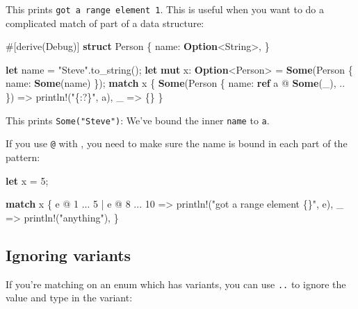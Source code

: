 \documentclass[a4paper,]{book}
\newenvironment{Shaded}{\begin{snugshade}}{\end{snugshade}}
\newcommand{\KeywordTok}[1]{\textcolor[rgb]{0.13,0.29,0.53}{\textbf{{#1}}}}
\newcommand{\DecValTok}[1]{\textcolor[rgb]{0.00,0.00,0.81}{{#1}}}
\newcommand{\StringTok}[1]{\textcolor[rgb]{0.31,0.60,0.02}{{#1}}}
\newcommand{\OtherTok}[1]{\textcolor[rgb]{0.56,0.35,0.01}{{#1}}}
\newcommand{\NormalTok}[1]{{#1}}
\begin{document}
This prints \texttt{got\ a\ range\ element\ 1}. This is useful when you
want to do a complicated match of part of a data structure:

\begin{Shaded}
\begin{Highlighting}[]
\OtherTok{#[}\NormalTok{derive}\OtherTok{(}\NormalTok{Debug}\OtherTok{)]}
\KeywordTok{struct} \NormalTok{Person \{}
    \NormalTok{name: }\KeywordTok{Option}\NormalTok{<String>,}
\NormalTok{\}}

\KeywordTok{let} \NormalTok{name = }\StringTok{"Steve"}\NormalTok{.to_string();}
\KeywordTok{let} \KeywordTok{mut} \NormalTok{x: }\KeywordTok{Option}\NormalTok{<Person> = }\KeywordTok{Some}\NormalTok{(Person \{ name: }\KeywordTok{Some}\NormalTok{(name) \});}
\KeywordTok{match} \NormalTok{x \{}
    \KeywordTok{Some}\NormalTok{(Person \{ name: }\KeywordTok{ref} \NormalTok{a @ }\KeywordTok{Some}\NormalTok{(_), .. \}) => }\OtherTok{println!}\NormalTok{(}\StringTok{"\{:?\}"}\NormalTok{, a),}
    \NormalTok{_ => \{\}}
\NormalTok{\}}
\end{Highlighting}
\end{Shaded}

This prints \texttt{Some("Steve")}: We've bound the inner \texttt{name}
to \texttt{a}.

If you use \texttt{@} with \texttt{\textbar{}}, you need to make sure
the name is bound in each part of the pattern:

\begin{Shaded}
\begin{Highlighting}[]
\KeywordTok{let} \NormalTok{x = }\DecValTok{5}\NormalTok{;}

\KeywordTok{match} \NormalTok{x \{}
    \NormalTok{e @ }\DecValTok{1} \NormalTok{... }\DecValTok{5} \NormalTok{| e @ }\DecValTok{8} \NormalTok{... }\DecValTok{10} \NormalTok{=> }\OtherTok{println!}\NormalTok{(}\StringTok{"got a range element \{\}"}\NormalTok{, e),}
    \NormalTok{_ => }\OtherTok{println!}\NormalTok{(}\StringTok{"anything"}\NormalTok{),}
\NormalTok{\}}
\end{Highlighting}
\end{Shaded}

\subsection{Ignoring variants}\label{ignoring-variants}

If you're matching on an enum which has variants, you can use
\texttt{..} to ignore the value and type in the variant:
\end{document}

